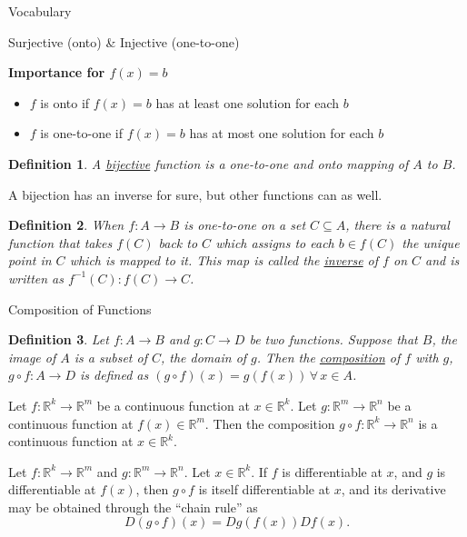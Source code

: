 \documentclass[xcolor=dvipsnames, compress, t]{beamer}
\newtheorem{defin}{Definition}
\begin{document}
\begin{frame}{Vocabulary}

{\color{MidnightBlue} Surjective (onto) \& Injective (one-to-one)}

{\bf Importance for $f(x) = b$}
\begin{itemize}
\item $f$ is onto if $f(x) = b$ has at least one solution for each $b$
\item $f$ is one-to-one if $f(x) = b$ has at most one solution for each $b$
\end{itemize} \pause

\begin{defin}
A \underline{bijective} function is a one-to-one and onto mapping of $A$ to $B$.
\end{defin}

A bijection has an inverse for sure, but other functions can as well. \pause

\begin{defin}
When $f:A\rightarrow B$ is one-to-one on a set $C \subseteq A$, there is a natural function that takes $f(C)$ back to $C$ which assigns to each $b \in f(C)$ the unique point in $C$ which is mapped to it. This map is called the \underline{inverse} of $f$ on $C$ and is written as $f^{-1}(C): f(C) \rightarrow C$.
\end{defin}

\end{frame}

\begin{frame}{Composition of Functions}

\begin{defin}
Let $f: A \rightarrow B$ and $g: C \rightarrow D$ be two functions. Suppose that $B$, the image of $A$ is a subset of $C$, the domain of $g$. Then the \underline{composition} of $f$ with $g$, $g\circ f: A \rightarrow D$ is defined as $(g \circ f) (x) = g(f(x)) \, \forall \, x \in A$.
\end{defin} \pause

\begin{theorem}
Let $f: \mathds{R}^k \rightarrow \mathds{R}^m$ be a continuous function at $x \in \mathds{R}^k$. Let $g: \mathds{R}^m \rightarrow \mathds{R}^n$ be a continuous function at $f(x) \in \mathds{R}^m$.  Then the composition $g \circ f: \mathds{R}^k \rightarrow \mathds{R}^n$ is a continuous function at $x \in \mathds{R}^k$.
\end{theorem}\pause

\begin{theorem}
Let $f: \mathds{R}^k \rightarrow \mathds{R}^m$ and $g: \mathds{R}^m \rightarrow \mathds{R}^n$. Let $x\in \mathds{R}^k$. If $f$ is differentiable at $x$, and $g$ is differentiable at $f(x)$, then $g\circ f$ is itself differentiable at $x$, and its derivative may be obtained through the ``chain rule'' as \vspace{-10pt} $$D(g\circ f) (x) = D g(f(x)) Df(x).$$
\end{theorem}

\end{frame}
\end{document}
